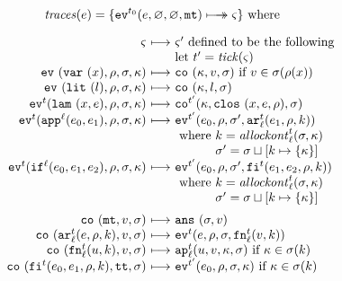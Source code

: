\documentclass[preprint,onecolumn,9pt]{sigplanconf} %
\begin{document}
\begin{figure}
\small
\begin{gather*}
\begin{align*}
\traces(\mexp) &= \{ \ev[^{\mtcntr}]{\mexp,\varnothing,\varnothing,\kmt} \multimachstep \mstate \} \text{ where }
\end{align*}
\\[2mm]
\begin{array}{@{}r@{\ }c@{\ }l@{}}
\mstate &\machstep&\mstate' \text{ defined to be the following} \\
&&\text{let } \mcntr' =\tick(\mstate) \\
\ev{\svar\mvar,\menv,\msto,\mkont} &\machstep&
\co{\mkont,\mval,\msto}
\text{ if }\mval \in \msto(\menv(\mvar))
\\
\ev{\slit\mlit,\menv,\msto,\mkont} &\machstep&
\co{\mkont,\mlit,\msto}
\\
\ev[^\mcntr]{\slam\mvar\mexp,\menv,\msto,\mkont} &\machstep&
\co[^{\mcntr'}]{\mkont,\clos{\mvar,\mexp,\menv},\msto}
\\
\ev[^\mcntr]{\sapp[^\mlab]{\mexpi0}{\mexpi1},\menv,\msto,\mkont} &\machstep&
\ev[^{\mcntr'}]{\mexpi{0},\menv,\msto',\kar[_\mlab^\mcntr]{\mexpi{1},\menv,\mkaddr}}
\\
&&
\text{ where }\mkaddr = \allockont^\mcntr_\mlab(\msto,\mkont) \\
&&\phantom{\text{ where }}\msto' = \msto\sqcup[\mkaddr \mapsto \setof{\mkont}]
\\
\ev[^\mcntr]{\sif[^\mlab]{\mexpi0}{\mexpi1}{\mexpi2},\menv,\msto,\mkont} &\machstep&
\ev[^{\mcntr'}]{\mexpi0,\menv,\msto',\kif[^\mcntr]{\mexpi1,\mexpi2,\menv,\mkaddr}}
\\
&&
\text{ where }\mkaddr = \allockont^\mcntr_\mlab(\msto,\mkont) \\
&&\phantom{\text{ where }}\msto' = \msto\sqcup[\mkaddr \mapsto \setof{\mkont}]
\\[2mm]
\co{\kmt,\mval,\msto} &\machstep&
\ans{\msto,\mval}
\\
\co{\kar[^\mcntr_\mlab]{\mexp,\menv,\mkaddr},\mval,\msto} & \machstep&
\ev[^\mcntr]{\mexp,\menv,\msto,\kfn[^\mcntr_\mlab]{\mval,\mkaddr}}
\\
\co{\kfn[^\mcntr_\mlab]{{\mvalx{u}},\mkaddr},\mval,\msto} & \machstep&
\ap[^\mcntr_\mlab]{\mvalx{u},\mval,\mkont,\msto}
\text{ if }\mkont \in \msto(\mkaddr)
\\
\co{\kif[^\mcntr]{\mexpi0,\mexpi1,\menv,\mkaddr},\strue,\msto} & \machstep&
\ev[^{\mcntr'}]{\mexpi0,\menv,\msto,\mkont}
\text{ if }\mkont\in\msto(\mkaddr)

\end{array}
\end{gather*}
\end{figure}
\end{document}
